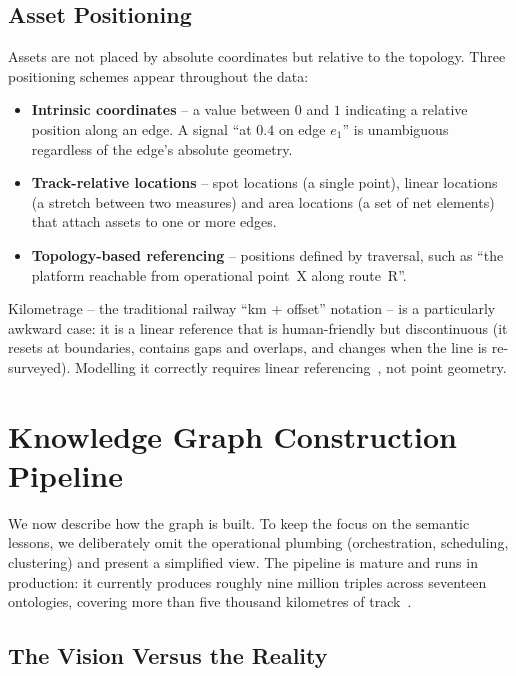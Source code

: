 \documentclass[twocolumn]{ceurart}
\begin{document}
\subsection{Asset Positioning}

Assets are not placed by absolute coordinates but relative to the topology. Three
positioning schemes appear throughout the data:

\begin{itemize}
  \item \textbf{Intrinsic coordinates} -- a value between $0$ and $1$ indicating
        a relative position along an edge. A signal ``at $0.4$ on edge $e_1$''
        is unambiguous regardless of the edge's absolute geometry.
  \item \textbf{Track-relative locations} -- spot locations (a single point),
        linear locations (a stretch between two measures) and area locations (a
        set of net elements) that attach assets to one or more edges.
  \item \textbf{Topology-based referencing} -- positions defined by traversal,
        such as ``the platform reachable from operational point~X along
        route~R''.
\end{itemize}

Kilometrage -- the traditional railway ``km + offset'' notation -- is a
particularly awkward case: it is a linear reference that is human-friendly but
discontinuous (it resets at boundaries, contains gaps and overlaps, and changes
when the line is re-surveyed). Modelling it correctly requires linear
referencing~\cite{lrs}, not point geometry.

\section{Knowledge Graph Construction Pipeline}
\label{sec:pipeline}

We now describe how the graph is built. To keep the focus on the semantic
lessons, we deliberately omit the operational plumbing (orchestration,
scheduling, clustering) and present a simplified view. The pipeline is mature
and runs in production: it currently produces roughly nine million triples
across seventeen ontologies, covering more than five thousand kilometres of
track~\cite{dim}.

\subsection{The Vision Versus the Reality}
\end{document}
